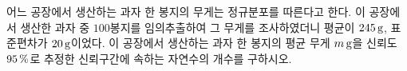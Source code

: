 어느 공장에서 생산하는 과자 한 봉지의 무게는 정규분포를 따른다고 한다. 이 공장에서 생산한 과자 중 $100$봉지를 임의추출하여 그 무게를 조사하였더니 평균이 $245\mkern3mu \mathrm{g}$, 표준편차가 $20\mkern3mu \mathrm{g}$이었다. 이 공장에서 생산하는 과자 한 봉지의 평균 무게 $m\mkern3mu \mathrm{g}$을 신뢰도 $95\mkern3mu \%$로 추정한 신뢰구간에 속하는 자연수의 개수를 구하시오. 

